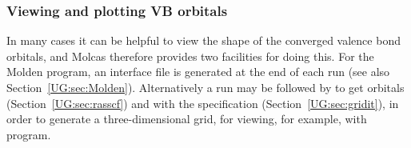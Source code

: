 \subsubsection{Viewing and plotting VB orbitals}


In many cases it can be helpful to view the shape of the converged valence bond orbitals, and
Molcas therefore provides two facilities for doing this. For the Molden program, an interface file
is generated at the end of each  run (see also Section~\ref{UG:sec:Molden}).
Alternatively a  run may be followed by  to get orbitals
(Section~\ref{UG:sec:rasscf}) and  with the  specification
(Section~\ref{UG:sec:gridit}), in order to generate a three-dimensional grid, for viewing, for example,
with  program.
